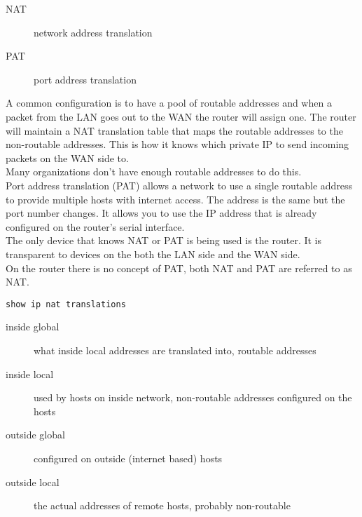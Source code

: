 \begin{description}

\item[NAT]
network address translation  

\item[PAT]
port address translation

\end{description}

A common configuration is to have a pool of routable addresses and when a
packet from the LAN goes out to the WAN the router will assign one. The
router will maintain a NAT translation table that maps the routable addresses
to the non-routable addresses. This is how it knows which private IP to
send incoming packets on the WAN side to.\\

Many organizations don't have enough routable addresses to do this.\\

Port address translation (PAT) allows a network to use a single routable
address to provide multiple hosts with internet access. The address is the
same but the port number changes. It allows you to use the IP address that is
already configured on the router's serial interface.\\

The only device that knows NAT or PAT is being used is the router. It
is transparent to devices on the both the LAN side and the WAN side.\\

On the router there is no concept of PAT, both NAT and PAT are referred to
as NAT.

\begin{verbatim}
show ip nat translations
\end{verbatim}

\begin{description}

\item[inside global]
what inside local addresses are translated into, routable addresses

\item[inside local]
used by hosts on inside network, non-routable addresses configured on the hosts

\item[outside global]
configured on outside (internet based) hosts

\item[outside local]
the actual addresses of remote hosts, probably non-routable

\end{description}

